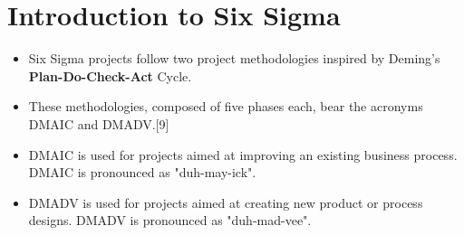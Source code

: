 \documentclass{beamer}
\begin{document}
\section{Introduction to Six Sigma}
\begin{frame}
\Large
\begin{itemize}
\item Six Sigma projects follow two project methodologies inspired by 
Deming's \textbf{Plan-Do-Check-Act} Cycle. 
\item These methodologies, composed of five phases each, bear the acronyms DMAIC and DMADV.[9]

\item DMAIC is used for projects aimed at improving an existing business process. DMAIC is pronounced as "duh-may-ick".
\item DMADV is used for projects aimed at creating new product or process designs. DMADV is pronounced as "duh-mad-vee".
\end{itemize}
\end{frame}

\end{document}
